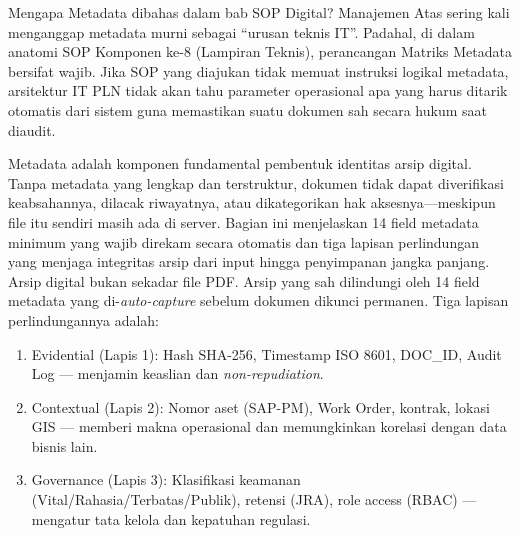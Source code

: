 \documentclass[12pt,a4paper]{report}
\begin{document}
Mengapa Metadata dibahas dalam bab SOP Digital? Manajemen Atas sering kali menganggap metadata murni sebagai ``urusan teknis IT''. Padahal, di dalam anatomi SOP Komponen ke-8 (Lampiran Teknis), perancangan Matriks Metadata bersifat wajib. Jika SOP yang diajukan tidak memuat instruksi logikal metadata, arsitektur IT PLN tidak akan tahu parameter operasional apa yang harus ditarik otomatis dari sistem guna memastikan suatu dokumen sah secara hukum saat diaudit.

Metadata adalah komponen fundamental pembentuk identitas arsip digital. Tanpa metadata yang lengkap dan terstruktur, dokumen tidak dapat diverifikasi keabsahannya, dilacak riwayatnya, atau dikategorikan hak aksesnya---meskipun file itu sendiri masih ada di server. Bagian ini menjelaskan 14 field metadata minimum yang wajib direkam secara otomatis dan tiga lapisan perlindungan yang menjaga integritas arsip dari input hingga penyimpanan jangka panjang.
Arsip digital bukan sekadar file PDF. Arsip yang sah dilindungi oleh 14 field metadata yang di-\textit{auto-capture} sebelum dokumen dikunci permanen. Tiga lapisan perlindungannya adalah:

\begin{enumerate}[leftmargin=*]
    \item Evidential (Lapis 1): Hash SHA-256, Timestamp ISO 8601, DOC\_ID, Audit Log --- menjamin keaslian dan \textit{non-repudiation}.
    \item Contextual (Lapis 2): Nomor aset (SAP-PM), Work Order, kontrak, lokasi GIS --- memberi makna operasional dan memungkinkan korelasi dengan data bisnis lain.
    \item Governance (Lapis 3): Klasifikasi keamanan (Vital/Rahasia/Terbatas/Publik), retensi (JRA), role access (RBAC) --- mengatur tata kelola dan kepatuhan regulasi.
\end{enumerate}
\end{document}
